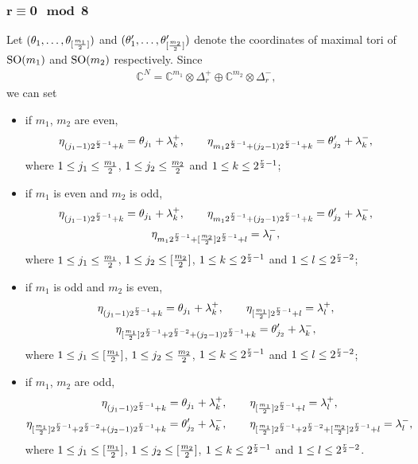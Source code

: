 \documentclass[pdftex]{sigma}
\numberwithin{equation}{section}
\begin{document}
\subsubsection[$r\equiv 0 \mod 8$]{$\boldsymbol{r\equiv 0 \mod 8}$}
Let $(\theta_1,\dots,\theta_{[{m_1\over2}]})$ and $(\theta_1',\dots,\theta_{[{m_2\over2}]}')$ denote the coordinates of maximal tori of ${\rm SO}(m_1)$ and ${\rm SO}(m_2)$ respectively. Since
\begin{gather*}\mathbb{C}^N=\mathbb{C}^{m_1}\otimes \Delta_r^+\oplus\mathbb{C}^{m_2}\otimes \Delta_r^-,\end{gather*}
we can set
\begin{itemize}\itemsep=0pt
 \item if $m_1$, $m_2$ are even,
 \begin{gather*}
 \eta_{(j_1-1)2^{{r\over 2}-1}+k}= \theta_{j_1} + \lambda_k^+, \qquad
 \eta_{m_12^{{r\over 2}-1}+(j_2-1)2^{{r\over 2}-1}+k}= \theta_{j_2}' + \lambda_k^- ,
\end{gather*}
where $1\leq j_1\leq {m_1\over 2}$, $1\leq j_2\leq {m_2\over 2}$ and $1\leq k \leq 2^{{r\over 2}-1}$;

 \item if $m_1$ is even and $m_2$ is odd,
 \begin{gather}
 \eta_{(j_1-1)2^{{r\over 2}-1}+k}= \theta_{j_1} + \lambda_k^+, \qquad
 \eta_{m_12^{{r\over 2}-1}+(j_2-1)2^{{r\over 2}-1}+k}= \theta_{j_2}' + \lambda_k^-, \nonumber\\
 \eta_{m_12^{{r\over 2}-1}+[{m_2\over2}]2^{{r\over 2}-1}+l}= \lambda_l^- ,\label{eq: pesos r=8 m1 even m2 odd}
\end{gather}
where $1\leq j_1\leq {m_1\over 2}$, $1\leq j_2\leq [{m_2\over 2}]$, $1\leq k \leq 2^{{r\over 2}-1}$ and $1\leq l \leq 2^{{r\over 2}-2}$;

 \item if $m_1$ is odd and $m_2$ is even,
 \begin{gather}
 \eta_{(j_1-1)2^{{r\over 2}-1}+k}= \theta_{j_1} + \lambda_k^+, \qquad
 \eta_{[{m_1\over2}]2^{{r\over 2}-1}+l}= \lambda_l^+ ,\nonumber\\
 \eta_{[{m_1\over2}]2^{{r\over 2}-1}+2^{{r\over 2}-2}+(j_2-1)2^{{r\over 2}-1}+k}= \theta_{j_2}'+ \lambda_k^- ,\label{eq: pesos r=8 m1 odd m2 even}
\end{gather}
where $1\leq j_1\leq [{m_1\over 2}]$, $1\leq j_2\leq {m_2\over 2}$, $1\leq k \leq 2^{{r\over 2}-1}$ and $1\leq l \leq 2^{{r\over 2}-2}$;

 \item if $m_1$, $m_2$ are odd,
 \begin{gather*}
 \eta_{(j_1-1)2^{{r\over 2}-1}+k}= \theta_{j_1} + \lambda_k^+, \qquad \eta_{[{m_1\over2}]2^{{r\over 2}-1}+l}= \lambda_l^+ ,\\
 \eta_{[{m_1\over2}]2^{{r\over 2}-1}+2^{{r\over 2}-2}+(j_2-1)2^{{r\over 2}-1}+k}= \theta_{j_2}'+ \lambda_k^- ,\qquad
 \eta_{[{m_1\over2}]2^{{r\over 2}-1}+2^{{r\over 2}-2}+[{m_2\over 2}]2^{{r\over 2}-1}+l}= \lambda_l^- ,
\end{gather*}
where $1\leq j_1\leq [{m_1\over 2}]$, $1\leq j_2\leq [{m_2\over 2}]$, $1\leq k \leq 2^{{r\over 2}-1}$ and $1\leq l \leq 2^{{r\over 2}-2}$.
\end{itemize}
\end{document}
